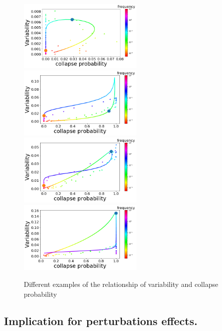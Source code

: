 \documentclass{article}
\begin{document}
\begin{figure}[h!]
\begin{center}
\includegraphics[width=6cm]{case_circle.png}
\includegraphics[width=6cm]{case_triangular.png}
\includegraphics[width=6cm]{case_linear.png}
\includegraphics[width=6cm]{case_clockwise.png}
\end{center}
\caption{\label{fig:temp}Different examples of the relationship of variability and collapse probability} %
\label{fig_loop}
\end{figure}





\newpage
\subsection{Implication for perturbations effects.}
\end{document}
